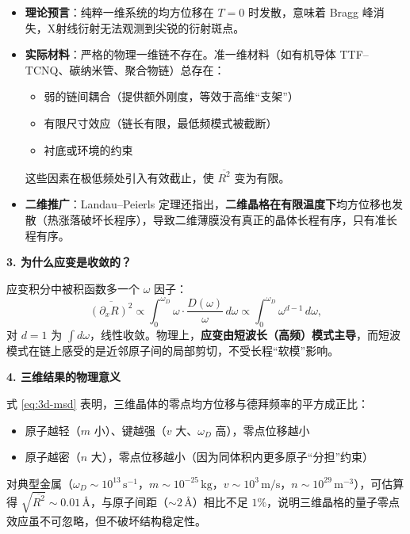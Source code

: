 \begin{insightbox}[物理图像与概念深化]
\begin{itemize}
    \item \textbf{理论预言}：纯粹一维系统的均方位移在 $T=0$ 时发散，意味着 Bragg 峰消失，X射线衍射无法观测到尖锐的衍射斑点。
    \item \textbf{实际材料}：严格的物理一维链不存在。准一维材料（如有机导体 TTF--TCNQ、碳纳米管、聚合物链）总存在：
    \begin{itemize}
        \item 弱的链间耦合（提供额外刚度，等效于高维``支架''）
        \item 有限尺寸效应（链长有限，最低频模式被截断）
        \item 衬底或环境的约束
    \end{itemize}
    这些因素在极低频处引入有效截止，使 $\overline{R^2}$ 变为有限。
    \item \textbf{二维推广}：Landau--Peierls 定理还指出，\textbf{二维晶格在有限温度下}均方位移也发散（热涨落破坏长程序），导致二维薄膜没有真正的晶体长程有序，只有准长程有序。
\end{itemize}

\textbf{3. 为什么应变是收敛的？}

应变积分中被积函数多一个 $\omega$ 因子：
\begin{equation}
\overline{(\partial_x R)^2}\propto\int_0^{\omega_D}\omega\cdot\frac{D(\omega)}{\omega}\,d\omega\propto\int_0^{\omega_D}\omega^{d-1}\,d\omega,
\end{equation}
对 $d=1$ 为 $\int d\omega$，线性收敛。物理上，\textbf{应变由短波长（高频）模式主导}，而短波模式在链上感受的是近邻原子间的局部剪切，不受长程``软模''影响。

\textbf{4. 三维结果的物理意义}

式 \eqref{eq:3d-msd} 表明，三维晶体的零点均方位移与德拜频率的平方成正比：
\begin{itemize}
    \item 原子越轻（$m$ 小）、键越强（$v$ 大、$\omega_D$ 高），零点位移越小
    \item 原子越密（$n$ 大），零点位移越小（因为同体积内更多原子``分担''约束）
\end{itemize}
对典型金属（$\omega_D\sim10^{13}\,\mathrm{s^{-1}}$，$m\sim10^{-25}\,\mathrm{kg}$，$v\sim10^3\,\mathrm{m/s}$，$n\sim10^{29}\,\mathrm{m^{-3}}$），可估算得 $\sqrt{\overline{R^2}}\sim0.01\,\text{\AA}$，与原子间距（$\sim2\,\text{\AA}$）相比不足 $1\%$，说明三维晶格的量子零点效应虽不可忽略，但不破坏结构稳定性。
\end{insightbox}

